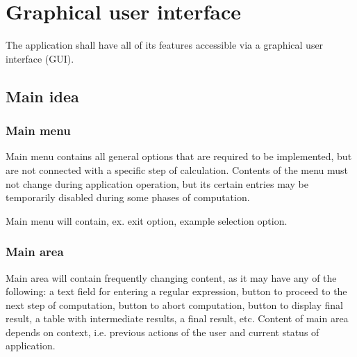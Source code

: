 \documentclass{article}
\begin{document}
\section{Graphical user interface}
The application shall have all of its features accessible via a graphical user interface (GUI).

\subsection{Main idea}

\subsubsection{Main menu}
Main menu contains all general options that are required to be implemented, but are not connected
with a specific step of calculation. Contents of the menu must not change during application
operation, but its certain entries may be temporarily disabled during some phases of computation.

Main menu will contain, ex. exit option, %
example selection option.

\subsubsection{Main area}
Main area will contain frequently changing content, as it may have any of the following: a text
field for entering a regular expression, button to proceed to the next step of computation, button
to abort computation, button to display final result, a table with intermediate results, a final
result, etc. Content of main area depends on context, i.e. previous actions of the user and current
status of application.
\end{document}
